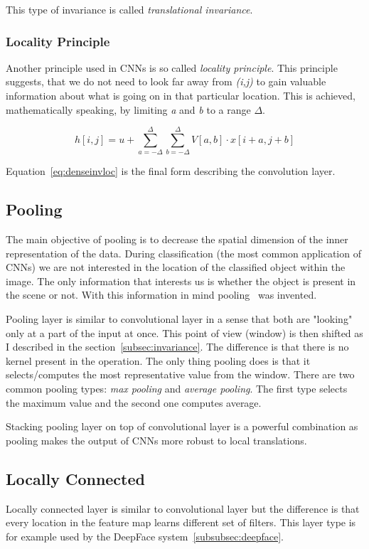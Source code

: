 This type of invariance is called \textit{translational invariance}.

\subsubsection{Locality Principle}\label{subsec:locality}
Another principle used in CNNs is so called \textit{locality principle}.
This principle suggests, that we do not need to look far away from \textit{(i,j)} to gain valuable information about
what is going on in that particular location.
This is achieved, mathematically speaking, by limiting \textit{a} and \textit{b} to a range $\Delta$.

\begin{equation}
    \label{eq:denseinvloc}
    h[i, j] = u + \sum_{a=-\Delta}^{\Delta} \sum_{b=-\Delta}^{\Delta} V[a,b] \cdot x[i+a,j+b]
\end{equation}

Equation~\ref{eq:denseinvloc} is the final form describing the convolution layer.

\subsection{Pooling}\label{subsec:pooling}
The main objective of pooling is to decrease the spatial dimension of the inner representation of the data.
During classification (the most common application of CNNs) we are not interested in the location of the classified
object within the image.
The only information that interests us is whether the object is present in the scene or not.
With this information in mind pooling~\cite{PoolingLayer} was invented.

Pooling layer is similar to convolutional layer in a sense that both are "looking" only at a part of the input at once.
This point of view (window) is then shifted as I described in the section~\ref{subsec:invariance}.
The difference is that there is no kernel present in the operation.
The only thing pooling does is that it selects/computes the most representative value from the window.
There are two common pooling types: \textit{max pooling} and \textit{average pooling}.
The first type selects the maximum value and the second one computes average.

Stacking pooling layer on top of convolutional layer is a powerful combination as pooling makes the output of CNNs
more robust to local translations\cite{DeepFace}.

\subsection{Locally Connected}\label{subsec:lclayer}
Locally connected layer is similar to convolutional layer but the difference is that every location in the feature map
learns different set of filters.
This layer type is for example used by the DeepFace system~\ref{subsubsec:deepface}.

